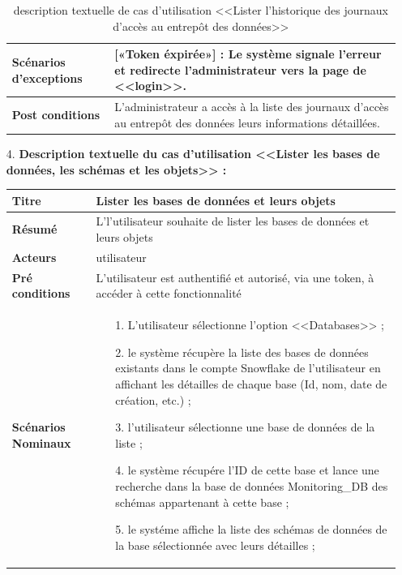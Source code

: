 \begin{enumerate}
\begin{table}[H]
\begin{tabular}{|p{3.5cm}|p{12cm}|}
            \hline  \textbf{Scénarios d'exceptions} & 
              [«Token éxpirée»] : Le système signale l'erreur et redirecte l'administrateur vers la page de <<login>>.\\
            \hline \textbf{Post conditions} & L'administrateur a accès à la liste des journaux d'accès au entrepôt des données leurs informations détaillées.\\
            \hline 
        \end{tabular}
        \caption{description textuelle de cas d'utilisation <<Lister l'historique des journaux d'accès au entrepôt des données>>}
        \end{table}
        
        \item[4.] \textbf{Description textuelle du cas d'utilisation <<Lister les bases de données, les schémas et les objets>> :}
    \begin{table}[H]
        \centering
        \begin{tabular}{|p{3.5cm}|p{12cm}|}
            \hline \textbf{Titre} &  Lister les bases de données et leurs objets\\
            \hline \textbf{Résumé} & L'l'utilisateur souhaite de lister les bases de données et leurs objets \\
            \hline \textbf{Acteurs} & utilisateur \\
            \hline \textbf{Pré conditions }& L'utilisateur est authentifié et autorisé, via une token, à accéder à cette fonctionnalité\\
            \hline \textbf{Scénarios Nominaux} &
                \begin{enumerate}
                    \item [1.] L'utilisateur sélectionne l'option <<Databases>> ;
                    \item [2.] le système récupère la liste des bases de données existants dans le compte Snowflake de l'utilisateur en affichant les détailles de chaque base (Id, nom, date de création, etc.) ;
                    \item [3.] l'utilisateur sélectionne une base de données de la liste ;
                    \item [4.] le système récupére l'ID de cette base et lance une recherche dans la base de données Monitoring\_DB des schémas appartenant à cette base ;
                    \item [5.] le systéme affiche la liste des schémas de données de la base sélectionnée avec leurs détailles ;

\end{enumerate}
\end{tabular}
\end{table}
\end{enumerate}
